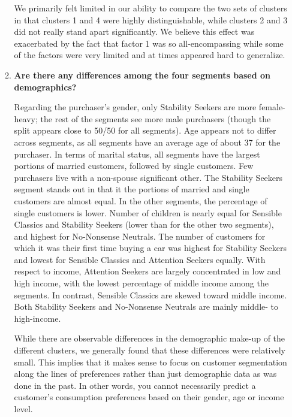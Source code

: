 \documentclass[10pt, oneside,spanish]{article}
\begin{document}
\begin{itemize}
\begin{enumerate}
 We primarily felt limited in our ability to compare the two sets of clusters in that clusters 1 and 4 were highly distinguishable, while clusters 2 and 3 did not really stand apart significantly. We believe this effect was exacerbated by the fact that factor 1 was so all-encompassing while some of the factors were very limited and at times appeared hard to generalize. 
    
    \item \textbf{Are there any differences among the four segments based on demographics?}
    
Regarding the purchaser's gender, only Stability Seekers are more female-heavy; the rest of the segments see more male purchasers (though the split appears close to 50/50 for all segments).  Age appears not to differ across segments, as all segments have an average age of about 37 for the purchaser.  In terms of marital status, all segments  have the largest portions of married customers, followed by single customers.  Few purchasers live with a non-spouse significant other.  The Stability Seekers segment stands out in that it the portions of married and single customers are almost equal.  In the other segments, the percentage of single customers is lower. Number of children is nearly equal for Sensible Classics and Stability Seekers (lower than for the other two segments),  and highest for No-Nonsense Neutrals.  The number of  customers for which it was their first time buying a car was highest  for Stability Seekers and lowest for Sensible Classics and Attention Seekers equally.  With respect to income, Attention Seekers  are largely concentrated in low and high income, with the lowest percentage of middle income among the segments.  In contrast, Sensible Classics are skewed toward middle income.  Both Stability Seekers and No-Nonsense Neutrals are mainly middle- to high-income.  

While there are observable differences in the demographic make-up of the different clusters, we generally found that these differences were relatively small. This implies that it makes sense to focus on customer segmentation along the lines of preferences rather than just demographic data as was done in the past. In other words, you cannot necessarily predict a customer's consumption preferences based on their gender, age or income level.
    
    \end{enumerate}
\end{itemize}

\pagebreak
\end{document}
